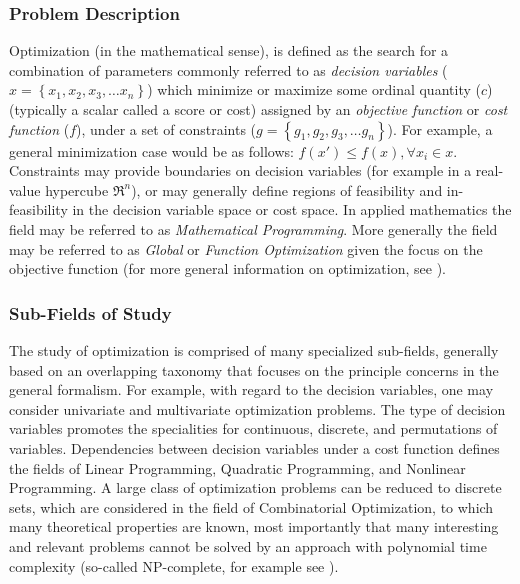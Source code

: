 \documentclass[a4paper, 11pt]{article}
\begin{document}
%
%
\subsubsection{Problem Description}
Optimization (in the mathematical sense), is defined as the search for a combination of parameters commonly referred to as \emph{decision variables} ($x = \left\{x_1, x_2, x_3, \ldots x_n\right\}$) which minimize or maximize some ordinal quantity ($c$) (typically a scalar  called a score or cost) assigned by an \emph{objective function} or \emph{cost function} ($f$), under a set of constraints ($g = \left\{g_1, g_2, g_3, \ldots g_n\right\}$). For example, a general minimization case would be as follows: $f(x\prime) \leq f(x), \forall x_i \in x$. Constraints may provide boundaries on decision variables (for example in a real-value hypercube $\Re^n$), or may generally define regions of feasibility and in-feasibility in the decision variable space or cost space. In applied mathematics the field may be referred to as \emph{Mathematical Programming}. More generally the field may be referred to as \emph{Global} or \emph{Function Optimization} given the focus on the objective function (for more general information on optimization, see \cite{Horst2000}). 

%
%
\subsubsection{Sub-Fields of Study}
The study of optimization is comprised of many specialized sub-fields, generally based on an overlapping taxonomy that focuses on the principle concerns in the general formalism. 
For example, with regard to the decision variables, one may consider univariate and multivariate optimization problems. The type of decision variables promotes the specialities for continuous, discrete, and permutations of variables. Dependencies between decision variables under a cost function defines the fields of Linear Programming, Quadratic Programming, and Nonlinear Programming. A large class of optimization problems can be reduced to discrete sets, which are considered in the field of Combinatorial Optimization, to which many theoretical properties are known, most importantly that many interesting and relevant problems cannot be solved by an approach with polynomial time complexity (so-called NP-complete, for example see \cite{Papadimitriou1998}).
\end{document}
